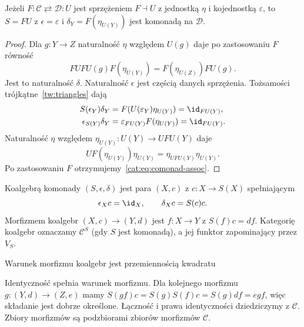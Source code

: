 \begin{stwierdzenie}\label{cat:prop:adjunction-comonad}
Jeżeli $F:\mathcal C\rightleftarrows\mathcal D:U$ jest sprzężeniem $F\dashv U$ z jednostką $\eta$ i kojednostką $\varepsilon$, to $S=FU$ z $\epsilon=\varepsilon$ i $\delta_Y=F(\eta_{U(Y)})$ jest komonadą na $\mathcal D$.
\end{stwierdzenie}
\begin{proof}
Dla $g:Y\to Z$ naturalność $\eta$ względem $U(g)$ daje po zastosowaniu $F$ równość
\[
 FUFU(g)F(\eta_{U(Y)})=F(\eta_{U(Z)})FU(g).
\]
Jest to naturalność $\delta$. Naturalność $\epsilon$ jest częścią danych sprzężenia. Tożsamości trójkątne~\ref{tw:triangles} dają
\begin{align*}
 S(\epsilon_Y)\delta_Y&=F(U(\varepsilon_Y)\eta_{U(Y)})=\id_{FU(Y)},\\
 \epsilon_{S(Y)}\delta_Y&=\varepsilon_{FU(Y)}F(\eta_{U(Y)})=\id_{FU(Y)}.
\end{align*}
Naturalność $\eta$ względem $\eta_{U(Y)}:U(Y)\to UFU(Y)$ daje
\[
 UF(\eta_{U(Y)})\eta_{U(Y)}=\eta_{UFU(Y)}\eta_{U(Y)}.
\]
Po zastosowaniu $F$ otrzymujemy~\eqref{cat:eq:comonad-assoc}.
\end{proof}

\begin{definicja}\label{cat:def:comonad-coalgebra}
Koalgebrą komonady $(S,\epsilon,\delta)$ jest para $(X,c)$ z $c:X\to S(X)$ spełniającym
\[
 \epsilon_Xc=\id_X,\qquad \delta_Xc=S(c)c.
\]
Morfizmem koalgebr $(X,c)\to(Y,d)$ jest $f:X\to Y$ z $S(f)c=df$. Kategorię koalgebr oznaczamy $\mathcal C^S$ (gdy $S$ jest komonadą), a jej funktor zapominający przez $V_S$.
\end{definicja}
Warunek morfizmu koalgebr jest przemiennością kwadratu
\begin{center}
\end{center}
Identyczność spełnia warunek morfizmu. Dla kolejnego morfizmu $g:(Y,d)\to(Z,e)$ mamy $S(gf)c=S(g)S(f)c=S(g)df=egf$, więc składanie jest dobrze określone. Łączność i prawa identyczności dziedziczymy z $\mathcal C$. Zbiory morfizmów są podzbiorami zbiorów morfizmów $\mathcal C$.

